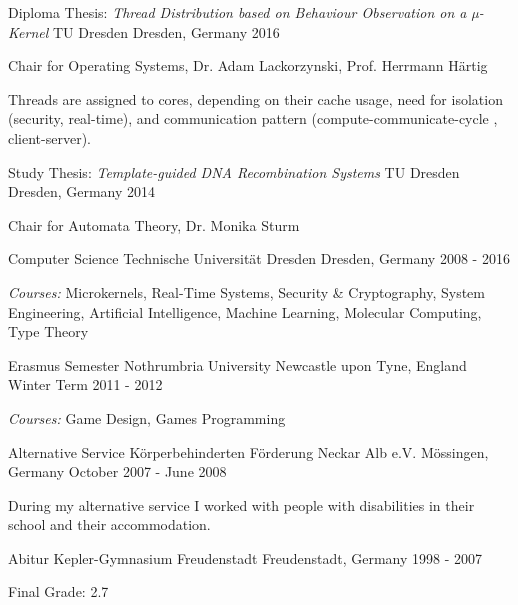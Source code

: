 \begin{cventries}
  \cventry
    {Diploma Thesis: \newline \quad
      \textit{Thread Distribution based on Behaviour Observation on a µ-Kernel}}
    {TU Dresden}
    {Dresden, Germany}
    {2016}
    {
      \begin{cvitems}
      \item{Chair for Operating Systems, Dr. Adam Lackorzynski, Prof. Herrmann
	Härtig}
      \item {Threads are assigned to cores, depending on their cache usage,
	  need for isolation (security, real-time), and communication pattern
	  (compute-communicate-cycle , client-server).}
      \end{cvitems}
    }
  \cventry
    {Study Thesis:\quad
      \textit{Template-guided DNA Recombination Systems}}
    {TU Dresden}
    {Dresden, Germany}
    {2014}
    {
      \begin{cvitems}
      \item[] {Chair for Automata Theory, Dr. Monika Sturm}
      \end{cvitems}
    }
  \cventry
    {Computer Science}
    {Technische Universität Dresden}
    {Dresden, Germany}
    {2008 - 2016}
    {
      \begin{cvitems}
      \item[] {\textit{Courses:} Microkernels, Real-Time Systems, Security \&
	  Cryptography, System Engineering, Artificial Intelligence,
	  Machine Learning, \newline \quad Molecular Computing, Type Theory}
      \end{cvitems}
    }
  \cventry
    {Erasmus Semester}
    {Nothrumbria University}
    {Newcastle upon Tyne, England}
    {Winter Term 2011 - 2012}
    {
      \begin{cvitems}
      \item[] {\textit{Courses:} Game Design, Games Programming }
      \end{cvitems}
    }
  \cventry
    {Alternative Service}
    {Körperbehinderten Förderung Neckar Alb e.V.}
    {Mössingen, Germany}
    {October 2007 - June 2008}
    {
      \begin{cvitems}
      \item[] {During my alternative service I worked with people with disabilities in
	their school and their accommodation.}
      \end{cvitems}
    }
  \cventry
    {Abitur}
    {Kepler-Gymnasium Freudenstadt}
    {Freudenstadt, Germany}
    {1998 - 2007}
    {
      \begin{cvitems}
      \item[] {Final Grade: 2.7}
      \end{cvitems}
    }
\end{cventries}

